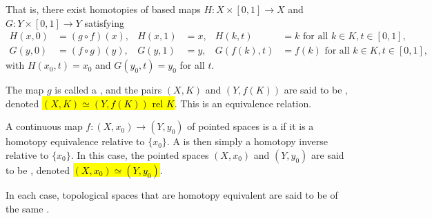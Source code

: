 \begin{definition}
\begin{enumerate}
            That is, there exist homotopies of based maps $H : X \times [0,1] \to X$ and $G : Y \times [0,1] \to Y$ satisfying
            \begin{align*}
            H(x,0) &= (g \circ f)(x), & H(x,1) &= x, & H(k,t) &= k \text{ for all } k \in K, t \in [0,1], \\
            G(y,0) &= (f \circ g)(y), & G(y,1) &= y, & G(f(k),t) &= f(k) \text{ for all } k \in K, t \in [0,1],
            \end{align*}
            with $H(x_0,t) = x_0$ and $G(y_0,t) = y_0$ for all $t$.
            
            The map $g$ is called a , and the pairs $(X,K)$ and $(Y,f(K))$ are said to be , denoted \hl{$(X,K) \simeq (Y,f(K))$ rel $K$}. This is an equivalence relation.
            
            A continuous map $f: (X,x_0) \to (Y,y_0)$ of pointed spaces is a  if it is a homotopy equivalence relative to $\{x_0\}$. A  is then simply a homotopy inverse relative to $\{x_0\}$. In this case, the pointed spaces $(X,x_0)$ and $(Y,y_0)$ are said to be , denoted \hl{$(X,x_0) \simeq (Y,y_0)$}.

        In each case, topological spaces that are homotopy equivalent are said to be of the same .
    \end{enumerate}


\end{definition}